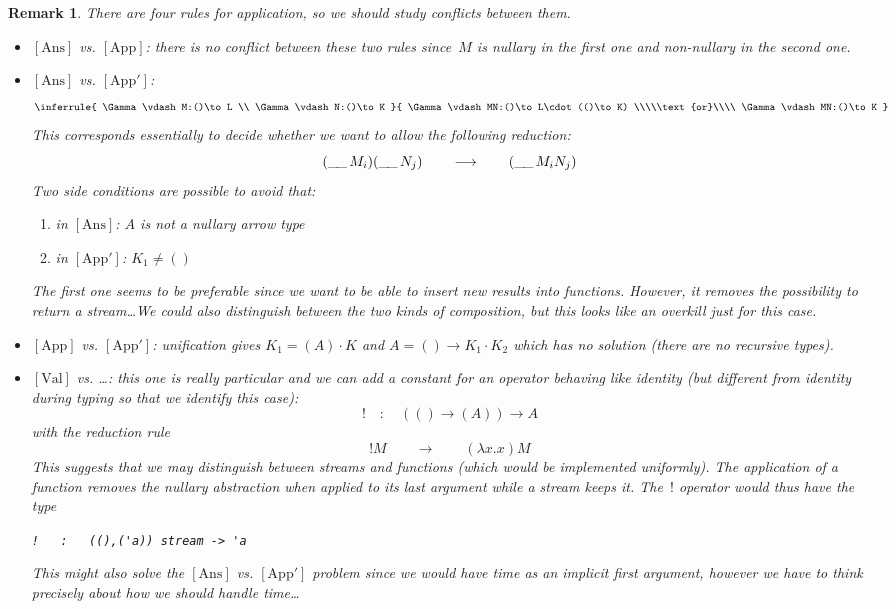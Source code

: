 \documentclass[a4paper,titlepage]{article}
\newcommand{\ret}{\mathop{\_\hspace{-.3ex}\_}}
\newcommand{\regle}[1]{\mathrm{[#1]}}
\newtheorem{remark}[theorem]{Remark}
\begin{document}
\begin{remark}
  There are four rules for application, so we should study conflicts between
  them.
  \begin{itemize}
  \item $\regle{Ans}$ vs. $\regle{App}$: there is no conflict between these two
    rules since~$M$ is nullary in the first one and non-nullary in the second
    one.
  \item $\regle{Ans}$ vs. $\regle{App'}$:
    \[
    \inferrule{
      \Gamma\vdash M:()\to L
      \\
      \Gamma\vdash N:()\to K
    }
    {
      \Gamma\vdash MN:()\to L\cdot(()\to K)
      \\\\\text{or}\\\\
      \Gamma\vdash MN:()\to K
    }
    \]
    This corresponds essentially to decide whether we want to allow the
    following reduction:
    \[
    (\ret M_i)(\ret N_j)
    \qquad\longrightarrow\qquad
    (\ret M_iN_j)
    \]
    Two side conditions are possible to avoid that:
    \begin{enumerate}
    \item in $\regle{Ans}$: $A$ is not a nullary arrow type
    \item in $\regle{App'}$: $K_1\neq ()$
    \end{enumerate}
    The first one seems to be preferable since we want to be able to insert new
    results into functions. However, it removes the possibility to return a
    stream\ldots We could also distinguish between the two kinds of composition,
    but this looks like an overkill just for this case.
  \item $\regle{App}$ vs. $\regle{App'}$: unification gives $K_1=(A)\cdot K$ and
    $A=()\to K_1\cdot K_2$ which has no solution (there are no recursive types).
  \item $\regle{Val}$ vs. \ldots: this one is really particular and we can add a
    constant for an operator behaving like identity (but different from identity
    during typing so that we identify this case):
    \[
    !\quad:\quad(()\to(A))\to A
    \]
    with the reduction rule
    \[
    !M
    \qquad\longrightarrow\qquad
    (\lambda x.x)M
    \]
    This suggests that we may distinguish between streams and functions (which
    would be implemented uniformly). The application of a function removes the
    nullary abstraction when applied to its last argument while a stream keeps
    it. The~$!$ operator would thus have the type
    \begin{center}
      \verb|!   :   ((),('a)) stream -> 'a|
    \end{center}
    This might also solve the $\regle{Ans}$ vs. $\regle{App'}$ problem since we
    would have time as an implicit first argument, however we have to think
    precisely about how we should handle time\ldots
  \end{itemize}
\end{remark}
\end{document}
